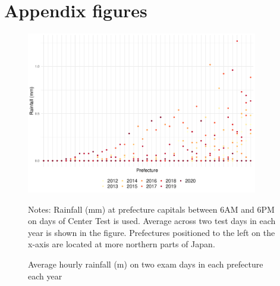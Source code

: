 \documentclass[12pt,letterpaper]{article}
\begin{document}
\appendix

\setcounter{figure}{0}
\setcounter{table}{0}
\renewcommand\thefigure{\Alph{section}.\arabic{figure}}
\renewcommand\thetable{\Alph{section}.\arabic{table}}
  
\section{Appendix figures}\label{sec:appendix_figure}

\begin{figure}[H]
  \centering
  \caption{Average hourly rainfall (m) on two exam days in each prefecture each year}
  \includegraphics[width = 0.9\textwidth]{../Output/images/rainfall_diff.pdf}
  \label{fig:rainfall_diff}
  \footnotesize
  \begin{tablenotes}
    \item Notes:
      Rainfall (mm) at prefecture capitals between 6AM and 6PM on days of Center Test is used.
      Average across two test days in each year is shown in the figure.
      Prefectures positioned to the left on the x-axis are located at more northern parts of Japan.
  \end{tablenotes}
\end{figure}
\end{document}
